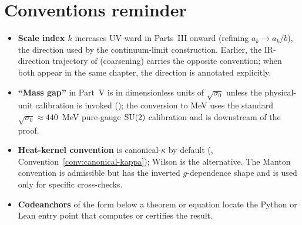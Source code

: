 \section{Conventions reminder}
\label{sec:notation-conventions}

\begin{itemize}
  \item \textbf{Scale index $k$} increases \textsc{UV}-ward in Parts~III
    onward (refining $a_k \to a_k / b$), the direction used by the
    continuum-limit construction.  Earlier, the \textsc{IR}-direction
    trajectory of 
    (coarsening) carries the opposite convention; when both appear
    in the same chapter, the direction is annotated explicitly.
  \item \textbf{``Mass gap''} in Part~V is in dimensionless units of
    $\sqrt{\sigma_0}$ unless the physical-unit calibration is
    invoked (); the conversion to
    MeV uses the standard $\sqrt{\sigma_0} \approx 440$~MeV
    pure-gauge $\mathrm{SU}(2)$ calibration and is downstream of the proof.
  \item \textbf{Heat-kernel convention} is canonical-$\kappa$ by default
    (, Convention~\ref{conv:canonical-kappa});
    Wilson is the alternative.  The Manton convention is admissible
    but has the inverted $g$-dependence shape and is used only for
    specific cross-checks.
  \item \textbf{Codeanchors} of the form
     below a theorem or equation locate the
    Python or Lean entry point that computes or certifies the
    result.
\end{itemize}
